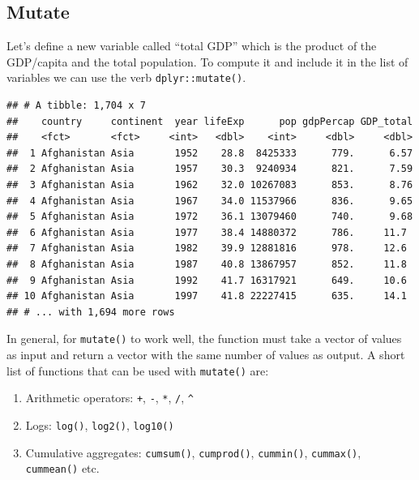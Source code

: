 \documentclass[]{article}
\newenvironment{Shaded}{\begin{snugshade}}{\end{snugshade}}
\newcommand{\KeywordTok}[1]{\textcolor[rgb]{0.13,0.29,0.53}{\textbf{#1}}}
\newcommand{\DataTypeTok}[1]{\textcolor[rgb]{0.13,0.29,0.53}{#1}}
\newcommand{\DecValTok}[1]{\textcolor[rgb]{0.00,0.00,0.81}{#1}}
\newcommand{\StringTok}[1]{\textcolor[rgb]{0.31,0.60,0.02}{#1}}
\newcommand{\CommentTok}[1]{\textcolor[rgb]{0.56,0.35,0.01}{\textit{#1}}}
\newcommand{\OperatorTok}[1]{\textcolor[rgb]{0.81,0.36,0.00}{\textbf{#1}}}
\newcommand{\NormalTok}[1]{#1}
\providecommand{\tightlist}{%
  \setlength{\itemsep}{0pt}\setlength{\parskip}{0pt}}
\begin{document}
\subsection{Mutate}\label{mutate}

Let's define a new variable called ``total GDP'' which is the product of
the GDP/capita and the total population. To compute it and include it in
the list of variables we can use the verb \texttt{dplyr::mutate()}.

\begin{Shaded}
\end{Shaded}

\begin{verbatim}
## # A tibble: 1,704 x 7
##    country     continent  year lifeExp      pop gdpPercap GDP_total
##    <fct>       <fct>     <int>   <dbl>    <int>     <dbl>     <dbl>
##  1 Afghanistan Asia       1952    28.8  8425333      779.      6.57
##  2 Afghanistan Asia       1957    30.3  9240934      821.      7.59
##  3 Afghanistan Asia       1962    32.0 10267083      853.      8.76
##  4 Afghanistan Asia       1967    34.0 11537966      836.      9.65
##  5 Afghanistan Asia       1972    36.1 13079460      740.      9.68
##  6 Afghanistan Asia       1977    38.4 14880372      786.     11.7 
##  7 Afghanistan Asia       1982    39.9 12881816      978.     12.6 
##  8 Afghanistan Asia       1987    40.8 13867957      852.     11.8 
##  9 Afghanistan Asia       1992    41.7 16317921      649.     10.6 
## 10 Afghanistan Asia       1997    41.8 22227415      635.     14.1 
## # ... with 1,694 more rows
\end{verbatim}

In general, for \texttt{mutate()} to work well, the function must take a
vector of values as input and return a vector with the same number of
values as output. A short list of functions that can be used with
\texttt{mutate()} are:

\begin{enumerate}
\def\labelenumi{\arabic{enumi}.}
\tightlist
\item
  Arithmetic operators: \texttt{+}, \texttt{-}, \texttt{*}, \texttt{/},
  \texttt{\^{}}
\item
  Logs: \texttt{log()}, \texttt{log2()}, \texttt{log10()}
\item
  Cumulative aggregates: \texttt{cumsum()}, \texttt{cumprod()},
  \texttt{cummin()}, \texttt{cummax()}, \texttt{cummean()} etc.
\end{enumerate}
\end{document}

